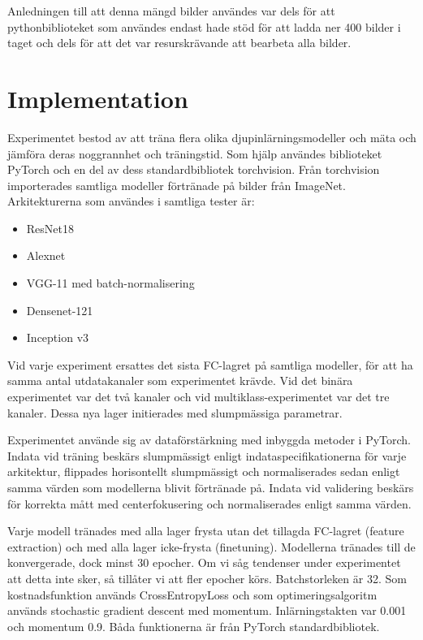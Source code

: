\documentclass[]{kththesis}
\begin{document}
Anledningen till att denna mängd bilder användes var dels för att pythonbiblioteket som användes endast hade stöd för att ladda ner 400 bilder i taget och dels för att det var resurskrävande att bearbeta alla bilder.


\section{Implementation}
Experimentet bestod av att träna flera olika djupinlärningsmodeller och mäta och jämföra deras noggrannhet och träningstid. Som hjälp användes biblioteket PyTorch \parencite{paszke2017automatic} och en del av dess standardbibliotek torchvision. Från torchvision importerades samtliga modeller förtränade på bilder från ImageNet. Arkitekturerna som användes i samtliga tester är:
\begin{itemize}
  \item ResNet18
  \item Alexnet
  \item VGG-11 med batch-normalisering
  \item Densenet-121
  \item Inception v3
\end{itemize}

Vid varje experiment ersattes det sista FC-lagret på samtliga modeller, för att ha samma antal utdatakanaler som experimentet krävde. Vid det binära experimentet var det två kanaler och vid multiklass-experimentet var det tre kanaler. Dessa nya lager initierades med slumpmässiga parametrar.

Experimentet använde sig av dataförstärkning med inbyggda metoder i PyTorch. Indata vid träning beskärs slumpmässigt enligt indataspecifikationerna för varje arkitektur, flippades horisontellt slumpmässigt och normaliserades sedan enligt samma värden som modellerna blivit förtränade på. Indata vid validering beskärs för korrekta mått med centerfokusering och normaliserades enligt samma värden.

Varje modell tränades med alla lager frysta utan det tillagda FC-lagret (feature extraction) och med alla lager icke-frysta (finetuning). Modellerna tränades till de konvergerade, dock minst 30 epocher. Om vi såg tendenser under experimentet att detta inte sker, så tillåter vi att fler epocher körs. Batchstorleken är 32. Som kostnadsfunktion används CrossEntropyLoss och som optimeringsalgoritm används stochastic gradient descent med momentum. Inlärningstakten var 0.001 och momentum 0.9. Båda funktionerna är från PyTorch standardbibliotek.
\end{document}

